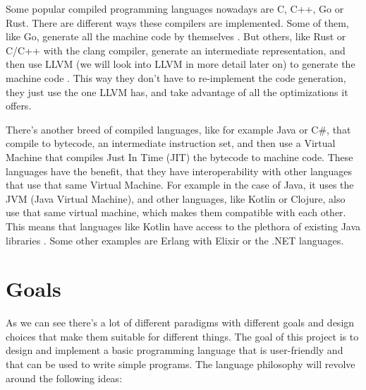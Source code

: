 ﻿\documentclass[10pt,a4paper,twocolumn,twoside]{article}
\begin{document}
Some popular compiled programming languages nowadays are C, C++, Go or Rust.
There are different ways these compilers are implemented. Some of them, like Go,
generate all the machine code by themselves \cite{gocodegen}. But others, like
Rust or C/C++ with the clang compiler, generate an intermediate representation,
and then use LLVM (we will look into LLVM in more detail later on) to generate
the machine code \cite{rustllvm} \cite{clangllvm}. This way they don't have to
re-implement the code generation, they just use the one LLVM has, and take
advantage of all the optimizations it offers.

There's another breed of compiled languages, like for example Java or C\#, that
compile to bytecode, an intermediate instruction set, and then use a Virtual 
Machine that compiles Just In Time (JIT) the bytecode to machine code. These 
languages have the benefit, that they have interoperability with other languages
that use that same Virtual Machine. For example in the case of Java, it uses the
JVM (Java Virtual Machine), and other languages, like Kotlin or Clojure, also
use that same virtual machine, which makes them compatible with each other. This
means that languages like Kotlin have access to the plethora of existing Java
libraries \cite{kotlininterop}. Some other examples are Erlang with Elixir
\cite{elixirinterop} or the .NET languages.



\section{Goals}

As we can see there's a lot of different paradigms with different goals and
design choices that make them suitable for different things. The goal of this
project is to design and implement a basic programming language that is
user-friendly and that can be used to write simple programs. The language
philosophy will revolve around the following ideas:
\end{document}
